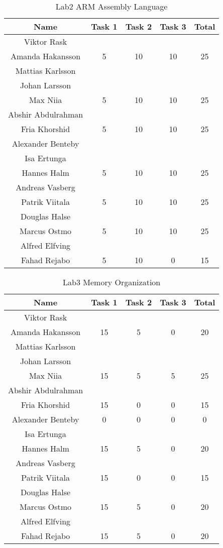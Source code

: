 \documentclass{article}
\begin{document}
\begin{table}[ht]
\caption{Lab2 ARM Assembly Language}
\centering 
\begin{tabular}{c c c c c} 
\hline\hline 
Name & Task 1 & Task 2 & Task 3 & Total \\ [0.5ex] 
\hline
Viktor Rask \\ Amanda Hakansson 
& 5 & 10 & 10 & 25 \\
\hline 
Mattias Karlsson \\ Johan Larsson \\ Max Niia 
& 5 & 10 & 10 & 25 \\
\hline 
Abshir Abdulrahman \\ Fria Khorshid 
& 5 & 10 & 10 & 25 \\
\hline 
Alexander Benteby \\ Isa Ertunga \\ Hannes Halm 
& 5 & 10 & 10 & 25 \\
\hline
Andreas Vasberg \\ Patrik Viitala
& 5 & 10 & 10 & 25 \\ 
\hline
Douglas Halse \\ Marcus Ostmo
& 5 & 10 & 10 & 25 \\ 
\hline
Alfred Elfving \\ Fahad Rejabo
& 5 & 10 & 0 & 15 \\
\hline
\end{tabular}
\label{table:nonlin}
\end{table}
 

\begin{table}[ht]
\caption{Lab3 Memory Organization}
\centering 
\begin{tabular}{c c c c c} 
\hline\hline 
Name & Task 1 & Task 2 & Task 3 & Total \\ [0.5ex] 
\hline
Viktor Rask \\ Amanda Hakansson 
& 15 & 5 & 0 & 20 \\
\hline 
Mattias Karlsson \\ Johan Larsson \\ Max Niia 
& 15 & 5 & 5 & 25 \\
\hline 
Abshir Abdulrahman \\ Fria Khorshid 
& 15 & 0 & 0 & 15 \\
\hline 
Alexander Benteby 
& 0 & 0 & 0 & 0 \\
\hline
Isa Ertunga \\ Hannes Halm 
& 15 & 5 & 0 & 20 \\
\hline
Andreas Vasberg \\ Patrik Viitala
& 15 & 0 & 0 & 15 \\ 
\hline
Douglas Halse \\ Marcus Ostmo
& 15 & 5 & 0 & 20 \\ 
\hline
Alfred Elfving \\ Fahad Rejabo
& 15 & 5 & 0 & 20 \\
\hline
\end{tabular}
\label{table:nonlin}
\end{table}
\end{document}

